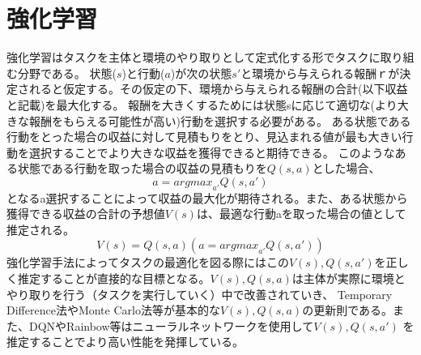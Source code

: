 \section{強化学習}
強化学習はタスクを主体と環境のやり取りとして定式化する形でタスクに取り組む分野である。
状態($s$)と行動($a$)が次の状態$s'$と環境から与えられる報酬ｒが決定されると仮定する。その仮定の下、環境から与えられる報酬の合計(以下収益と記載)を最大化する。
報酬を大きくするためには状態sに応じて適切な(より大きな報酬をもらえる可能性が高い)行動を選択する必要がある。
ある状態である行動をとった場合の収益に対して見積もりをとり、見込まれる値が最も大きい行動を選択することでより大きな収益を獲得できると期待できる。
このようなある状態である行動を取った場合の収益の見積もりを$Q(s, a)$とした場合、
\begin{equation}
	a = {argmax}_{a'} Q(s, a')
\end{equation}
となるa選択することによって収益の最大化が期待される。また、ある状態から獲得できる収益の合計の予想値$V(s)$は、最適な行動aを取った場合の値として推定される。
\begin{equation}
	V(s) = Q(s, a)(a = {argmax}_{a'} Q(s, a'))
\end{equation}
強化学習手法によってタスクの最適化を図る際にはこの$V(s),Q(s, a')$を正しく推定することが直接的な目標となる。$V(s),Q(s, a)$は主体が実際に環境とやり取りを行う（タスクを実行していく）中で改善されていき、
Temporary Difference法\cite{oord2016wavenet}やMonte Carlo法\cite{oord2016wavenet}等が基本的な$V(s),Q(s, a)$の更新則である。また、DQN\cite{oord2016wavenet}やRainbow\cite{oord2016wavenet}等はニューラルネットワークを使用して$V(s),Q(s, a')$
を推定することでより高い性能を発揮している。



